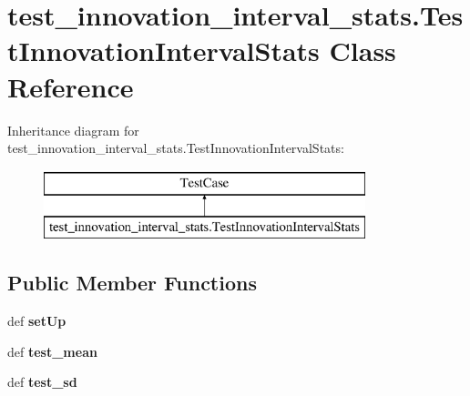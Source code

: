 \hypertarget{classtest__innovation__interval__stats_1_1_test_innovation_interval_stats}{\section{test\-\_\-innovation\-\_\-interval\-\_\-stats.\-Test\-Innovation\-Interval\-Stats Class Reference}
\label{classtest__innovation__interval__stats_1_1_test_innovation_interval_stats}
}
Inheritance diagram for test\-\_\-innovation\-\_\-interval\-\_\-stats.\-Test\-Innovation\-Interval\-Stats\-:\begin{figure}[H]
\begin{center}
\leavevmode
\includegraphics[height=2.000000cm]{classtest__innovation__interval__stats_1_1_test_innovation_interval_stats}
\end{center}
\end{figure}
\subsection*{Public Member Functions}
\begin{DoxyCompactItemize}
\item 
\hypertarget{classtest__innovation__interval__stats_1_1_test_innovation_interval_stats_a5c9d017a45cff00b45cf054185319b31}{def {\bfseries set\-Up}}\label{classtest__innovation__interval__stats_1_1_test_innovation_interval_stats_a5c9d017a45cff00b45cf054185319b31}

\item 
\hypertarget{classtest__innovation__interval__stats_1_1_test_innovation_interval_stats_a062f28a063d38a3c09c766a8d521ba34}{def {\bfseries test\-\_\-mean}}\label{classtest__innovation__interval__stats_1_1_test_innovation_interval_stats_a062f28a063d38a3c09c766a8d521ba34}

\item 
\hypertarget{classtest__innovation__interval__stats_1_1_test_innovation_interval_stats_aab3abfbea9309ab0240584c3b5df776c}{def {\bfseries test\-\_\-sd}}\label{classtest__innovation__interval__stats_1_1_test_innovation_interval_stats_aab3abfbea9309ab0240584c3b5df776c}

\end{DoxyCompactItemize}
